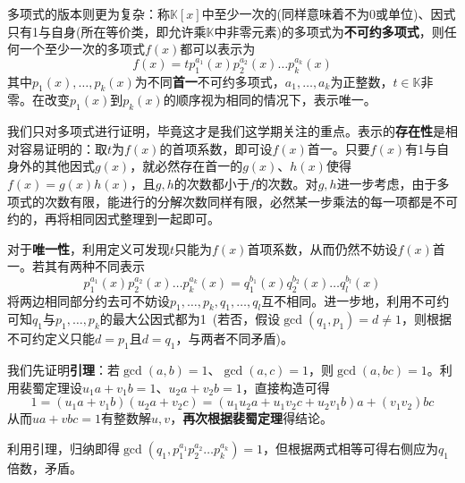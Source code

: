 \documentclass[a4paper,UTF8,fontset=windows,AutoFakeBold]{ctexart}
\begin{document}
多项式的版本则更为复杂：称$\mathbb{K}[x]$中至少一次的(同样意味着不为0或单位)、因式只有1与自身(所在等价类，即允许乘$\mathbb{K}$中非零元素)的多项式为\textbf{不可约多项式}，则任何一个至少一次的多项式$f(x)$都可以表示为
$$f(x)=tp_1^{a_1}(x)p_2^{a_2}(x)\dots p_k^{a_k}(x)$$
其中$p_1(x),\dots,p_k(x)$为不同\textbf{首一}不可约多项式，$a_1,\dots,a_k$为正整数，$t\in\mathbb{K}$非零。在改变$p_1(x)$到$p_k(x)$的顺序视为相同的情况下，表示唯一。

我们只对多项式进行证明，毕竟这才是我们这学期关注的重点。表示的\textbf{存在性}是相对容易证明的：取$t$为$f(x)$的首项系数，即可设$f(x)$首一。只要$f(x)$有1与自身外的其他因式$g(x)$，就必然存在首一的$g(x)$、$h(x)$使得$f(x)=g(x)h(x)$，且$g,h$的次数都小于$f$的次数。对$g,h$进一步考虑，由于多项式的次数有限，能进行的分解次数同样有限，必然某一步乘法的每一项都是不可约的，再将相同因式整理到一起即可。

对于\textbf{唯一性}，利用定义可发现$t$只能为$f(x)$首项系数，从而仍然不妨设$f(x)$首一。若其有两种不同表示
$$p_1^{a_1}(x)p_2^{a_2}(x)\dots p_k^{a_k}(x)=q_1^{b_1}(x)q_2^{b_2}(x)\dots q_l^{b_l}(x)$$
将两边相同部分约去可不妨设$p_1,\dots,p_k,q_1,\dots,q_l$互不相同。进一步地，利用不可约可知$q_1$与$p_1,\dots,p_k$的最大公因式都为1\ (若否，假设$\gcd(q_1,p_1)=d\ne1$，则根据不可约定义只能$d=p_1$且$d=q_1$，与两者不同矛盾)。

我们先证明\textbf{引理}：若$\gcd(a,b)=1$、$\gcd(a,c)=1$，则$\gcd(a,bc)=1$。利用裴蜀定理设$u_1a+v_1b=1$、$u_2a+v_2b=1$，直接构造可得
$$1=(u_1a+v_1b)(u_2a+v_2c)=(u_1u_2a+u_1v_2c+u_2v_1b)a+(v_1v_2)bc$$
从而$ua+vbc=1$有整数解$u,v$，\textbf{再次根据裴蜀定理}得结论。

利用引理，归纳即得$\gcd(q_1,p_1^{a_1}p_2^{a_2}\dots p_k^{a_k})=1$，但根据两式相等可得右侧应为$q_1$倍数，矛盾。

\
\end{document}
